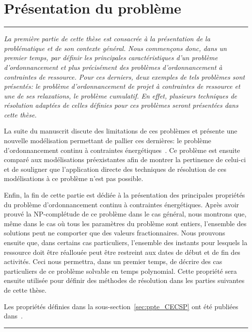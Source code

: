 \cleardoublepage
\begin{minipage}{0.95\linewidth}
  \part{Présentation du problème}
  \vspace{15mm} %
  \parttoc 

\end{minipage}

\newpage
\thispagestyle{empty}
\begin{center}
  \begin{minipage}{\textwidth}
    \hrule
    \vspace{0.5cm}
    {\it  La première partie de cette thèse est consacrée à la présentation de
      la problématique et de son contexte général. Nous commençons donc,
    dans un premier temps, par définir les principales caractéristiques
    d'un problème d'ordonnancement et plus précisément des problèmes
    d'ordonnancement à contraintes de ressource. Pour ces derniers,
    deux exemples de tels problèmes sont présentés: le problème
    d'ordonnancement de projet à contraintes de ressource et une de ses relaxations, le
    problème cumulatif. En effet, plusieurs techniques de résolution
    adaptées de celles définies pour ces problèmes seront présentées
    dans cette thèse. 

    La suite du manuscrit discute des limitations de ces problèmes
    et présente une nouvelle modélisation permettant de pallier ces
    dernières: le problème d'ordonnancement continu à contraintes
    énergétiques~\cite{ArtiguesLopez,Nattaf_ORSpectrum,Nattaf_Constraints}. Ce
    problème est ensuite comparé aux modélisations préexistantes afin de
    montrer la pertinence de celui-ci et de souligner que l'application
    directe des techniques de résolution de ces modélisations à ce
    problème n'est pas possible.

    Enfin, la fin de cette partie est dédiée à la présentation des
    principales propriétés du problème d'ordonnancement continu à
    contraintes énergétiques. Après avoir prouvé la NP-complétude de ce
    problème dans le cas général, nous montrons que, même dans le cas où
    tous les paramètres du problème sont entiers, l'ensemble des solutions
    peut ne comporter que des valeurs fractionnaires. Nous prouvons
    ensuite que, dans certains cas particuliers, l'ensemble des instants
    pour lesquels la ressource doit être réallouée peut être
    restreint aux dates de début et de fin des activités. Ceci nous
    permettra, dans un premier temps, de décrire des cas particuliers
    de ce problème solvable en temps polynomial. Cette propriété sera
    ensuite utilisée pour définir des méthodes de résolution dans les
    parties suivantes de cette thèse. 

    Les propriétés définies dans la sous-section~\ref{sec:ppte_CECSP}
    ont été publiées
    dans~\cite{Nattaf_ORSpectrum,Nattaf_Constraints,Nattaf_CPDP}.} 
    \vspace{0.5cm}
    \hrule
  \end{minipage}
\end{center}
